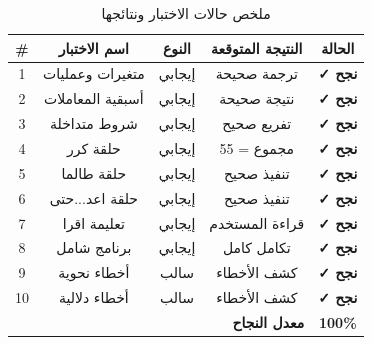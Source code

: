 \documentclass[12pt,a4paper]{report}
\begin{document}
\begin{table}[H]
\caption{\arabicfont ملخص حالات الاختبار ونتائجها}
\label{tab:test-results}
\centering
\begin{tabular}{|c|c|c|c|c|}
\hline
\rowcolor{TableHead}
\textbf{\#} & \textbf{\arabicfont اسم الاختبار} & \textbf{\arabicfont النوع} & \textbf{\arabicfont النتيجة المتوقعة} & \textbf{\arabicfont الحالة} \\
\hline
1 & \arabicfont متغيرات وعمليات & \arabicfont إيجابي & \arabicfont ترجمة صحيحة & \textcolor{SuccessGreen}{\textbf{✓ نجح}} \\
\hline
\rowcolor{TableAlt}
2 & \arabicfont أسبقية المعاملات & \arabicfont إيجابي & \arabicfont نتيجة صحيحة & \textcolor{SuccessGreen}{\textbf{✓ نجح}} \\
\hline
3 & \arabicfont شروط متداخلة & \arabicfont إيجابي & \arabicfont تفريع صحيح & \textcolor{SuccessGreen}{\textbf{✓ نجح}} \\
\hline
\rowcolor{TableAlt}
4 & \arabicfont حلقة كرر & \arabicfont إيجابي & \arabicfont مجموع = 55 & \textcolor{SuccessGreen}{\textbf{✓ نجح}} \\
\hline
5 & \arabicfont حلقة طالما & \arabicfont إيجابي & \arabicfont تنفيذ صحيح & \textcolor{SuccessGreen}{\textbf{✓ نجح}} \\
\hline
\rowcolor{TableAlt}
6 & \arabicfont حلقة اعد...حتى & \arabicfont إيجابي & \arabicfont تنفيذ صحيح & \textcolor{SuccessGreen}{\textbf{✓ نجح}} \\
\hline
7 & \arabicfont تعليمة اقرا & \arabicfont إيجابي & \arabicfont قراءة المستخدم & \textcolor{SuccessGreen}{\textbf{✓ نجح}} \\
\hline
\rowcolor{TableAlt}
8 & \arabicfont برنامج شامل & \arabicfont إيجابي & \arabicfont تكامل كامل & \textcolor{SuccessGreen}{\textbf{✓ نجح}} \\
\hline
9 & \arabicfont أخطاء نحوية & \arabicfont سالب & \arabicfont كشف الأخطاء & \textcolor{SuccessGreen}{\textbf{✓ نجح}} \\
\hline
\rowcolor{TableAlt}
10 & \arabicfont أخطاء دلالية & \arabicfont سالب & \arabicfont كشف الأخطاء & \textcolor{SuccessGreen}{\textbf{✓ نجح}} \\
\hline
\multicolumn{4}{|r|}{\textbf{\arabicfont معدل النجاح}} & \textcolor{SuccessGreen}{\textbf{100\%}} \\
\hline
\end{tabular}
\end{table}

\end{document}
